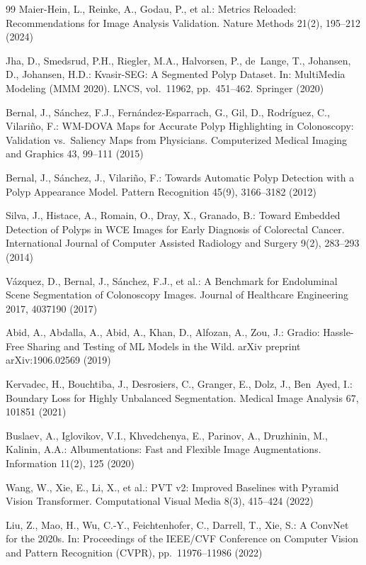 \begin{thebibliography}{99}
Maier-Hein, L., Reinke, A., Godau, P., et al.: Metrics Reloaded:
Recommendations for Image Analysis Validation. Nature Methods 21(2),
195--212 (2024)

Jha, D., Smedsrud, P.H., Riegler, M.A., Halvorsen, P., de~Lange, T.,
Johansen, D., Johansen, H.D.: Kvasir-SEG: A Segmented Polyp Dataset. In:
MultiMedia Modeling (MMM 2020). LNCS, vol.~11962, pp.~451--462. Springer (2020)

Bernal, J., S\'anchez, F.J., Fern\'andez-Esparrach, G., Gil, D., Rodr\'iguez, C.,
Vilari\~no, F.: WM-DOVA Maps for Accurate Polyp Highlighting in Colonoscopy:
Validation vs.\ Saliency Maps from Physicians. Computerized Medical Imaging and
Graphics 43, 99--111 (2015)

Bernal, J., S\'anchez, J., Vilari\~no, F.: Towards Automatic Polyp Detection
with a Polyp Appearance Model. Pattern Recognition 45(9), 3166--3182
(2012)

Silva, J., Histace, A., Romain, O., Dray, X., Granado, B.: Toward Embedded
Detection of Polyps in WCE Images for Early Diagnosis of Colorectal Cancer.
International Journal of Computer Assisted Radiology and Surgery
9(2), 283--293 (2014)

V\'azquez, D., Bernal, J., S\'anchez, F.J., et al.: A Benchmark for
Endoluminal Scene Segmentation of Colonoscopy Images. Journal of Healthcare
Engineering 2017, 4037190 (2017)

Abid, A., Abdalla, A., Abid, A., Khan, D., Alfozan, A., Zou, J.: Gradio:
Hassle-Free Sharing and Testing of ML Models in the Wild. arXiv preprint
arXiv:1906.02569 (2019)

Kervadec, H., Bouchtiba, J., Desrosiers, C., Granger, E., Dolz, J.,
Ben~Ayed, I.: Boundary Loss for Highly Unbalanced Segmentation. Medical Image
Analysis 67, 101851 (2021)

Buslaev, A., Iglovikov, V.I., Khvedchenya, E., Parinov, A., Druzhinin, M.,
Kalinin, A.A.: Albumentations: Fast and Flexible Image Augmentations.
Information 11(2), 125 (2020)

Wang, W., Xie, E., Li, X., et al.: PVT v2: Improved Baselines with Pyramid
Vision Transformer. Computational Visual Media 8(3), 415--424 (2022)

Liu, Z., Mao, H., Wu, C.-Y., Feichtenhofer, C., Darrell, T., Xie, S.: A ConvNet
for the 2020s. In: Proceedings of the IEEE/CVF Conference on Computer Vision and
Pattern Recognition (CVPR), pp.~11976--11986 (2022)


\end{thebibliography}

